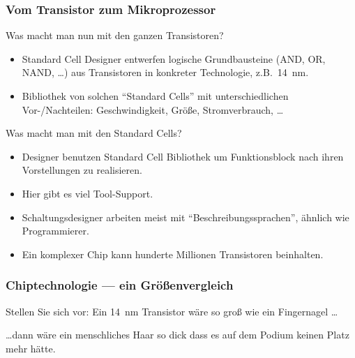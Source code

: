 \begin{frame}
	\frametitle{Vom Transistor zum Mikroprozessor}
	\begin{block}{Was macht man nun mit den ganzen Transistoren?}
		\begin{itemize}
			\item Standard Cell Designer entwerfen logische Grundbausteine
				(AND, OR, NAND, \ldots) aus Transistoren in konkreter
				Technologie, z.B.\ \SI{14}{\nano\meter}.
			\item Bibliothek von solchen ``Standard Cells'' mit
				unterschiedlichen Vor-/Nachteilen: Geschwindigkeit, Größe,
				Stromverbrauch, \ldots
		\end{itemize}
	\end{block}
\end{frame}

\begin{frame}
	\begin{block}{Was macht man mit den Standard Cells?}
		\begin{itemize}
			\item Designer benutzen Standard Cell Bibliothek um Funktionsblock
				nach ihren Vorstellungen zu realisieren.
			\item Hier gibt es viel Tool-Support.
			\item Schaltungsdesigner arbeiten meist mit ``Beschreibungssprachen'',
                              ähnlich wie Programmierer.
			\item Ein komplexer Chip kann hunderte Millionen Transistoren
				beinhalten.
		\end{itemize}
	\end{block}
\end{frame}



\begin{frame}
	\frametitle{Chiptechnologie --- ein Größenvergleich}
	\begin{exampleblock}{Stellen Sie sich vor:}
		Ein \SI{14}{\nano\meter} Transistor %
		wäre so groß wie ein Fingernagel %
		\ldots\\

		\pause

		\bigskip
		\ldots dann wäre ein menschliches Haar %
                so dick dass es auf dem Podium keinen Platz mehr hätte. %

	\end{exampleblock}

\end{frame}

